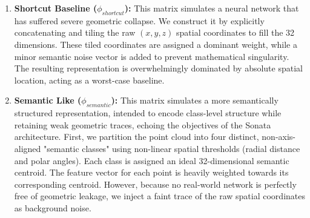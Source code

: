 \documentclass[11pt, a4paper]{article}
\begin{document}
\begin{enumerate}
    \item \textbf{Shortcut Baseline ($\phi_{shortcut}$):} This matrix simulates a neural network that has suffered severe geometric collapse. We construct it by explicitly concatenating and tiling the raw $(x, y, z)$ spatial coordinates to fill the 32 dimensions. These tiled coordinates are assigned a dominant weight, while a minor semantic noise vector is added to prevent mathematical singularity. The resulting representation is overwhelmingly dominated by absolute spatial location, acting as a worst-case baseline.
    \item \textbf{Semantic Like ($\phi_{semantic}$):} This matrix simulates a more semantically structured representation, intended to encode class-level structure while retaining weak geometric traces, echoing the objectives of the Sonata architecture. First, we partition the point cloud into four distinct, non-axis-aligned "semantic classes" using non-linear spatial thresholds (radial distance and polar angles). Each class is assigned an ideal 32-dimensional semantic centroid. The feature vector for each point is heavily weighted towards its corresponding centroid. However, because no real-world network is perfectly free of geometric leakage, we inject a faint trace of the raw spatial coordinates as background noise. 
\end{enumerate}
\end{document}
